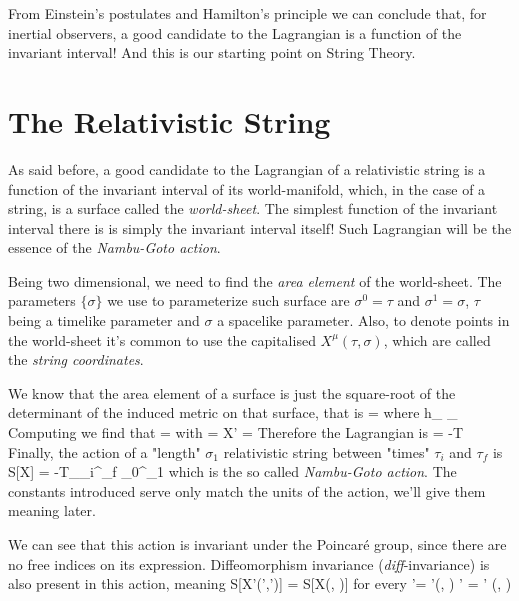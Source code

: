 \documentclass[oneside, 12pt, notitlepage]{book}
\begin{document}
From Einstein's postulates and Hamilton's principle we can conclude that, for inertial observers, a good candidate to the Lagrangian is a function of the invariant interval! And this is our starting point on String Theory.\par

\section{The Relativistic String}

As said before, a good candidate to the Lagrangian of a relativistic string is a function of the invariant interval of its world-manifold, which, in the case of a string, is a surface called the \textit{world-sheet}. The simplest function of the invariant interval there is is simply the invariant interval itself! Such Lagrangian will be the essence of the \textit{Nambu-Goto action}.\par

Being two dimensional, we need to find the \textit{area element} of the world-sheet. The parameters \(\{ \sigma\}\) we use to parameterize such surface are \(\sigma^0 = \tau\) and \(\sigma^1 = \sigma\), \(\tau\) being a timelike parameter and \(\sigma\) a spacelike parameter. Also, to denote points in the world-sheet it's common to use the capitalised \(X^{\mu}(\tau,\sigma)\), which are called the \textit{string coordinates}.\par

We know that the area element of a surface is just the square-root of the determinant of the induced metric on that surface, that is
\beq[]  = \eeq
where
\beq[] h_{\alpha \beta} \equiv \eta_{\mu \nu}\eeq
Computing we find that
\beq[]  = \eeq
with
\beq[]  =  X' = \eeq
Therefore the Lagrangian is
\beq[]  = -T\eeq
Finally, the action of a "length" \(\sigma_1\) relativistic string between "times" \(\tau_i\) and \(\tau_f\) is
\beq[eq:nambugotoaction] S[X] = -T\int_{\tau_i}^{\tau_f} \dd{\tau} \int_{0}^{\sigma_1}\dd{\sigma} \eeq
which is the so called \textit{Nambu-Goto action}. The constants introduced serve only match the units of the action, we'll give them meaning later.\par

We can see that this action is invariant under the Poincaré group, since there are no free indices on its expression. Diffeomorphism invariance (\textit{diff}-invariance) is also present in this action, meaning
\beq[eq:diffinvar1] S[X'(\tau ',\sigma ')] = S[X(\tau, \sigma)]\eeq
for every
\beq[eq:diffinvar2] \tau '= \tau '(\tau, \sigma) \sigma ' = \sigma ' (\tau, \sigma)\eeq\par
\end{document}
